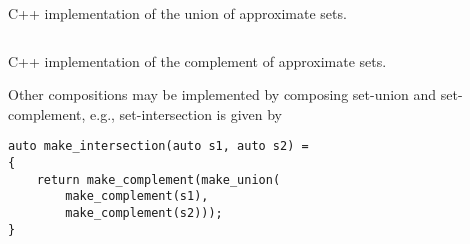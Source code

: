 \documentclass[ ../main.tex]{subfiles}
\begin{document}

\begin{listing}
	\inputminted[breaklines]{c++}{code/random_approximate_sets_adt/include/approximate_set/dynamic/aset_union.hpp}
	\caption{C++ implementation of the union of approximate sets.}
	\label{lst:asetunion}
\end{listing}

\begin{listing}
	\inputminted[breaklines]{c++}{code/random_approximate_sets_adt/include/approximate_set/dynamic/aset_complement.hpp}
	\caption{C++ implementation of the complement of approximate sets.}
	\label{lst:asetcomp}
\end{listing}

Other compositions may be implemented by composing set-union and set-complement, e.g., set-intersection is given by
\begin{verbatim}
auto make_intersection(auto s1, auto s2) =
{
    return make_complement(make_union(
        make_complement(s1),
        make_complement(s2)));
}
\end{verbatim}
\end{document}
